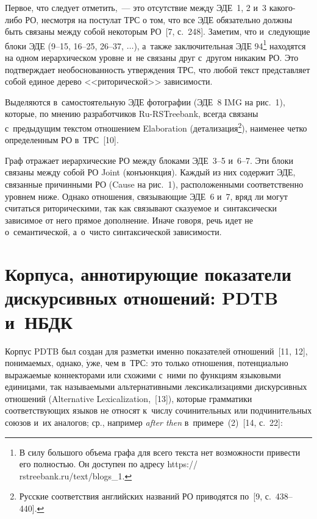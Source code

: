 \begin{multicols}{2}
Первое, что следует отметить,~--- это отсутствие между ЭДЕ~1, 2 и~3  
ка\-ко\-го-ли\-бо РО, несмотря на постулат ТРС о том, что все ЭДЕ обязательно должны быть связаны между собой 
некоторым РО~[7, с.~248]. Заметим, что и~сле\-ду\-ющие блоки ЭДЕ (9--15, 16--25, 26--37, $\ldots$), а~также 
заключительная ЭДЕ 94\footnote{В силу большого объема графа для всего текста нет возможности привести его 
полностью. Он доступен по адресу {\sf https:// rstreebank.ru/text/blogs\_1}.} находятся на одном иерархическом 
уровне и~не связаны друг с~другом никаким РО. Это подтверждает необоснованность утверждения ТРС, что любой 
текст пред\-став\-ля\-ет собой единое дерево <<риторической>> за\-ви\-си\-мости. 
    
Выделяются в~самостоятельную ЭДЕ фотографии (ЭДЕ~8 IMG на рис.~1), 
которые, по мнению разработчиков Ru-RSTreebank, всегда связаны с~предыдущим 
текстом отношением Elaboration (детализация\footnote{Русские соответствия 
английских названий РО приводятся по~[9, с.~438--440].}), наименее чет\-ко 
определенным РО в~ТРС~[10]. 




    Граф отражает иерархические РО между блоками ЭДЕ~3--5 и~6--7. Эти блоки 
связаны между собой РО Joint (конъюнкция). Каждый из них содержит ЭДЕ, 
связанные причинными РО (Cause на рис.~1), расположенными соответственно 
уровнем ниже. Однако отношения, свя\-зы\-ва\-ющие ЭДЕ~6 и~7, вряд ли могут 
считаться риторическими, так как связывают ска\-зу\-емое и~синтаксически 
зависимое от него прямое дополнение. Иначе говоря, речь идет не 
о~семантической, а~о~чис\-то синтаксической за\-ви\-си\-мости.

\vspace*{-6pt}

\section{Корпуса, аннотирующие показатели дискурсивных отношений: 
PDTB и~НБДК}

    Корпус PDTB был соз\-дан для разметки именно показателей отношений~[11, 
12], по\-ни\-ма\-емых, однако, $\acute{\mbox{у}}$же, чем в~ТРС: это только 
отношения, потенциально вы\-ра\-жа\-емые коннекторами или схожими с~ними по 
функциям языковыми единицами, так называемыми альтернативными 
лексикализациями дискурсивных отношений (Alternative Lexicalization,~[13]), 
которые грамматики соответствующих языков не относят к~чис\-лу сочинительных 
или подчинительных союзов и~их аналогов; ср., например \textit{after then} 
в~примере~(2)~[14, с.~22]:


\end{multicols}
